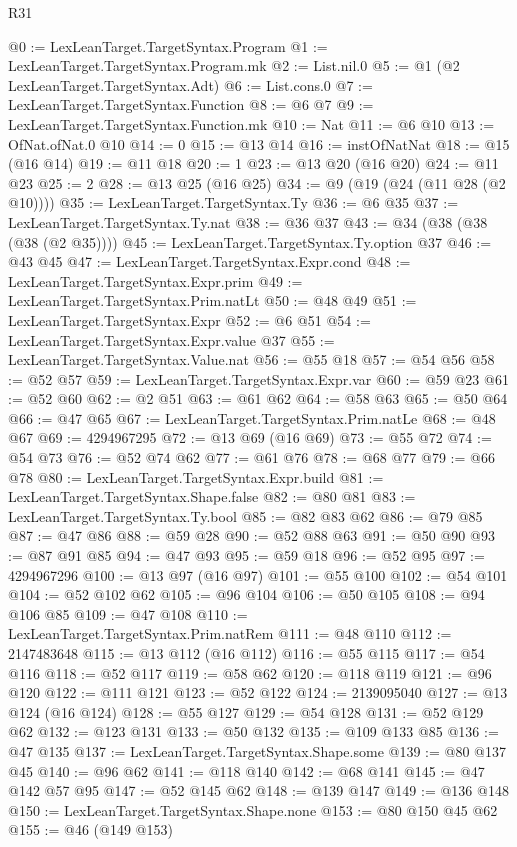 \begin{lexlean}{R31}
\begin{coremodule}
@0 := LexLeanTarget.TargetSyntax.Program
@1 := LexLeanTarget.TargetSyntax.Program.mk
@2 := List.nil.{0}
@5 := @1 (@2 LexLeanTarget.TargetSyntax.Adt)
@6 := List.cons.{0}
@7 := LexLeanTarget.TargetSyntax.Function
@8 := @6 @7
@9 := LexLeanTarget.TargetSyntax.Function.mk
@10 := Nat
@11 := @6 @10
@13 := OfNat.ofNat.{0} @10
@14 := 0
@15 := @13 @14
@16 := instOfNatNat
@18 := @15 (@16 @14)
@19 := @11 @18
@20 := 1
@23 := @13 @20 (@16 @20)
@24 := @11 @23
@25 := 2
@28 := @13 @25 (@16 @25)
@34 := @9 (@19 (@24 (@11 @28 (@2 @10))))
@35 := LexLeanTarget.TargetSyntax.Ty
@36 := @6 @35
@37 := LexLeanTarget.TargetSyntax.Ty.nat
@38 := @36 @37
@43 := @34 (@38 (@38 (@38 (@2 @35))))
@45 := LexLeanTarget.TargetSyntax.Ty.option @37
@46 := @43 @45
@47 := LexLeanTarget.TargetSyntax.Expr.cond
@48 := LexLeanTarget.TargetSyntax.Expr.prim
@49 := LexLeanTarget.TargetSyntax.Prim.natLt
@50 := @48 @49
@51 := LexLeanTarget.TargetSyntax.Expr
@52 := @6 @51
@54 := LexLeanTarget.TargetSyntax.Expr.value @37
@55 := LexLeanTarget.TargetSyntax.Value.nat
@56 := @55 @18
@57 := @54 @56
@58 := @52 @57
@59 := LexLeanTarget.TargetSyntax.Expr.var
@60 := @59 @23
@61 := @52 @60
@62 := @2 @51
@63 := @61 @62
@64 := @58 @63
@65 := @50 @64
@66 := @47 @65
@67 := LexLeanTarget.TargetSyntax.Prim.natLe
@68 := @48 @67
@69 := 4294967295
@72 := @13 @69 (@16 @69)
@73 := @55 @72
@74 := @54 @73
@76 := @52 @74 @62
@77 := @61 @76
@78 := @68 @77
@79 := @66 @78
@80 := LexLeanTarget.TargetSyntax.Expr.build
@81 := LexLeanTarget.TargetSyntax.Shape.false
@82 := @80 @81
@83 := LexLeanTarget.TargetSyntax.Ty.bool
@85 := @82 @83 @62
@86 := @79 @85
@87 := @47 @86
@88 := @59 @28
@90 := @52 @88 @63
@91 := @50 @90
@93 := @87 @91 @85
@94 := @47 @93
@95 := @59 @18
@96 := @52 @95
@97 := 4294967296
@100 := @13 @97 (@16 @97)
@101 := @55 @100
@102 := @54 @101
@104 := @52 @102 @62
@105 := @96 @104
@106 := @50 @105
@108 := @94 @106 @85
@109 := @47 @108
@110 := LexLeanTarget.TargetSyntax.Prim.natRem
@111 := @48 @110
@112 := 2147483648
@115 := @13 @112 (@16 @112)
@116 := @55 @115
@117 := @54 @116
@118 := @52 @117
@119 := @58 @62
@120 := @118 @119
@121 := @96 @120
@122 := @111 @121
@123 := @52 @122
@124 := 2139095040
@127 := @13 @124 (@16 @124)
@128 := @55 @127
@129 := @54 @128
@131 := @52 @129 @62
@132 := @123 @131
@133 := @50 @132
@135 := @109 @133 @85
@136 := @47 @135
@137 := LexLeanTarget.TargetSyntax.Shape.some
@139 := @80 @137 @45
@140 := @96 @62
@141 := @118 @140
@142 := @68 @141
@145 := @47 @142 @57 @95
@147 := @52 @145 @62
@148 := @139 @147
@149 := @136 @148
@150 := LexLeanTarget.TargetSyntax.Shape.none
@153 := @80 @150 @45 @62
@155 := @46 (@149 @153)

\end{coremodule}
\end{lexlean}
